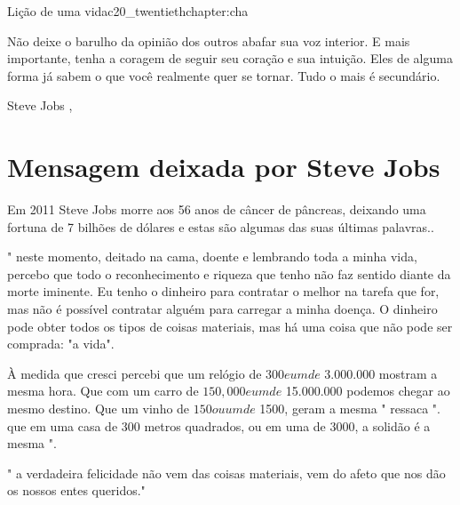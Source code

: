 \begin{chapterpage}{Lição de uma vida}{c20_twentiethchapter:cha}

\begin{myquotation}Não deixe o barulho da opinião dos outros abafar sua voz interior. E mais importante, tenha a coragem de seguir seu coração e sua intuição. Eles de alguma forma já sabem o que você realmente quer se tornar. Tudo o mais é secundário.


 
\par\vspace*{15mm}
\mbox{}\hfill \emdash{}Steve Jobs 
, %
\par\end{myquotation}

\end{chapterpage}



\section{Mensagem deixada por Steve Jobs}\label{c1_basicformatting:sec}

\emdash{}Em 2011 Steve Jobs morre aos 56 anos de câncer de pâncreas, deixando uma fortuna de 7 bilhões de dólares e estas são algumas das suas últimas palavras..

" neste momento, deitado na cama, doente e lembrando toda a minha vida, percebo que todo o reconhecimento e riqueza que tenho não faz sentido diante da morte iminente. Eu tenho o dinheiro para contratar o melhor na tarefa que for, mas não é possível contratar alguém para carregar a minha doença. O dinheiro pode obter todos os tipos de coisas materiais, mas há uma coisa que não pode ser comprada: "a vida".

À medida que cresci percebi que um relógio de $ 300 e um de $ 3.000.000 mostram a mesma hora. Que com um carro de $ 150,000 e um de $ 15.000.000 podemos chegar ao mesmo destino. Que um vinho de $ 150 ou um de $ 1500, geram a mesma " ressaca ". que em uma casa de 300 metros quadrados, ou em uma de 3000, a solidão é a mesma ".

" a verdadeira felicidade não vem das coisas materiais, vem do afeto que nos dão os nossos entes queridos."

